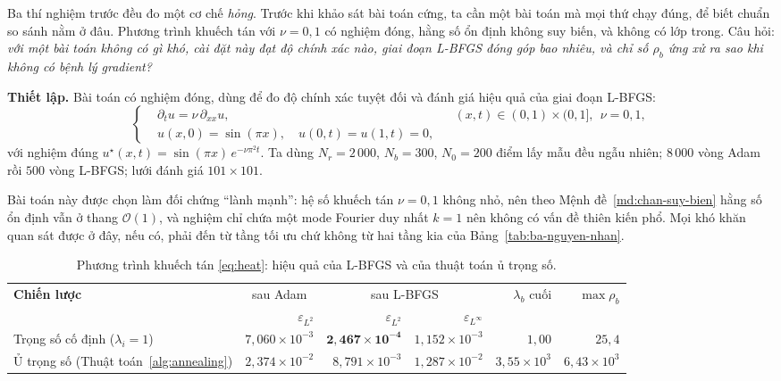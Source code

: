 \begin{thinghiem}
\label{tn:heat}
Ba thí nghiệm trước đều đo một cơ chế \emph{hỏng}. Trước khi khảo sát bài toán
cứng, ta cần một bài toán mà mọi thứ chạy đúng, để biết chuẩn so sánh nằm ở đâu.
Phương trình khuếch tán với $\nu = 0{,}1$ có nghiệm đóng, hằng số ổn định không
suy biến, và không có lớp trong. Câu hỏi: \emph{với một bài toán không có gì
khó, cài đặt này đạt độ chính xác nào, giai đoạn L-BFGS đóng góp bao nhiêu, và
chỉ số $\rho_b$ ứng xử ra sao khi không có bệnh lý gradient?}
\end{thinghiem}

\textbf{Thiết lập.} Bài toán có nghiệm đóng, dùng để đo độ chính xác tuyệt đối và
đánh giá hiệu quả của giai đoạn L-BFGS:
\begin{equation}
\left\{
\begin{aligned}
&\partial_t u = \nu\, \partial_{xx} u,
  && (x,t) \in (0,1)\times(0,1], \ \ \nu = 0{,}1,\\
&u(x,0) = \sin(\pi x), \quad u(0,t) = u(1,t) = 0,
\end{aligned}
\right.
\label{eq:heat}
\end{equation}
với nghiệm đúng $u^{\star}(x,t) = \sin(\pi x)\,e^{-\nu\pi^2 t}$. Ta dùng
$N_r = 2\,000$, $N_b = 300$, $N_0 = 200$ điểm lấy mẫu đều ngẫu nhiên; $8\,000$
vòng Adam rồi $500$ vòng L-BFGS; lưới đánh giá $101\times101$.
 
Bài toán này được chọn làm đối chứng ``lành mạnh'': hệ số khuếch tán
$\nu = 0{,}1$ không nhỏ, nên theo Mệnh đề~\ref{md:chan-suy-bien} hằng số ổn
định vẫn ở thang $\mathcal{O}(1)$, và nghiệm chỉ chứa một mode Fourier duy nhất
$k=1$ nên không có vấn đề thiên kiến phổ. Mọi khó khăn quan sát được ở đây, nếu
có, phải đến từ tầng tối ưu chứ không từ hai tầng kia của
Bảng~\ref{tab:ba-nguyen-nhan}.
 
\begin{table}[H]
\centering
\caption{Phương trình khuếch tán \eqref{eq:heat}: hiệu quả của L-BFGS và của thuật
toán ủ trọng số.}
\label{tab:tn4}
\small
\setlength{\tabcolsep}{3pt}   %
\begin{tabular}{@{}lrrrrr@{}}
\toprule
\multirow{2}{*}{\textbf{Chiến lược}}
& \multicolumn{1}{c}{sau Adam} & \multicolumn{2}{c}{sau L-BFGS}
& \multirow{2}{*}{$\lambda_b$ cuối} & \multirow{2}{*}{$\max \rho_b$} \\
\cmidrule(lr){2-2}\cmidrule(lr){3-4}
& $\varepsilon_{L^2}$ & $\varepsilon_{L^2}$ & $\varepsilon_{L^{\infty}}$ & & \\
\midrule
Trọng số cố định ($\lambda_i = 1$)
& $7{,}060\times10^{-3}$ & $\mathbf{2{,}467\times10^{-4}}$
& $1{,}152\times10^{-3}$ & $1{,}00$ & $25{,}4$ \\
Ủ trọng số (Thuật toán~\ref{alg:annealing})
& $2{,}374\times10^{-2}$ & $8{,}791\times10^{-3}$
& $1{,}287\times10^{-2}$ & $3{,}55\times10^{3}$ & $6{,}43\times10^{3}$ \\
\bottomrule
\end{tabular}
\end{table}
 
